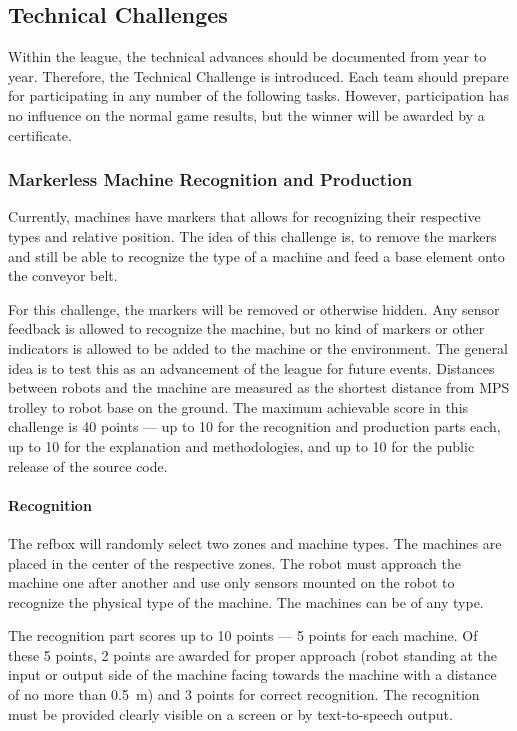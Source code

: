 \documentclass[12pt,twoside]{article}
\begin{document}
\subsection{Technical Challenges}
\label{sec:technical-challenge}
Within the league, the technical advances should be documented from
year to year. Therefore, the Technical Challenge is introduced. Each
team should prepare for participating in any number of the following
tasks. However, participation has no influence on the normal game
results, but the winner will be awarded by a certificate.


\subsubsection{Markerless Machine Recognition and Production}
Currently, machines have markers that allows for recognizing their
respective types and relative position. The idea of this challenge is,
to remove the markers and still be able to recognize the type of a
machine and feed a base element onto the conveyor belt.

For this challenge, the markers will be removed or otherwise
hidden. Any sensor feedback is allowed to recognize the machine, but
no kind of markers or other indicators is allowed to be added to the
machine or the environment. The general idea is to test this as an
advancement of the league for future events. Distances between robots
and the machine are measured as the shortest distance from MPS trolley
to robot base on the ground. The maximum achievable score in this
challenge is 40 points --- up to 10 for the recognition and production
parts each, up to 10 for the explanation and methodologies, and up to
10 for the public release of the source code.

\vspace{-2ex}\paragraph{Recognition}
The refbox will randomly select two zones and machine types. The
machines are placed in the center of the respective zones. The robot
must approach the machine one after another and use only sensors
mounted on the robot to recognize the physical type of the
machine. The machines can be of any type.

The recognition part scores up to 10 points --- 5 points for each
machine. Of these 5 points, 2 points are awarded for proper approach
(robot standing at the input or output side of the machine facing
towards the machine with a distance of no more than \SI{0.5}{\metre})
and 3 points for correct recognition. The recognition must be provided
clearly visible on a screen or by text-to-speech output.
\end{document}

